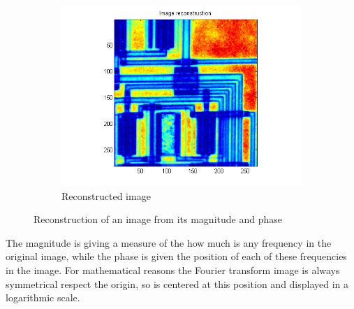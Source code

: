 \documentclass[a4paper, 10pt, conference] {article}
\begin{document}
\begin{figure}[H]
\begin{subfigure}{0.32\textwidth}
		\includegraphics[scale=0.5]{reportImages/exp1_reconstructed.PNG}
		\caption{Reconstructed image}
	\end{subfigure}
	\caption{Reconstruction of an image from its magnitude and phase}
	\label{exp1}
\end{figure}
The magnitude is giving a measure of the how much is any frequency in the original image, while the phase is given the position of each of these frequencies in the image. For mathematical reasons the Fourier transform image is always symmetrical respect the origin, so is centered at this position and displayed in a logarithmic scale.\\
\end{document}
